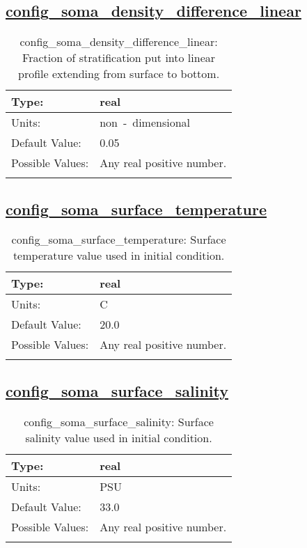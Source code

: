 \subsection[config\_soma\_density\_difference\_linear]{\hyperref[sec:nm_tab_soma]{config\_soma\_density\_difference\_linear}}
\label{subsec:nm_sec_config_soma_density_difference_linear}
\begin{center}
\begin{longtable}{| p{2.0in} || p{4.0in} |}
    \hline
    Type: & real \\
    \hline
    Units: & \si{non-dimensional} \\
    \hline
    Default Value: & 0.05 \\
    \hline
    Possible Values: & Any real positive number. \\
    \hline
    \caption{config\_soma\_density\_difference\_linear: Fraction of stratification put into linear profile extending from surface to bottom.}
\end{longtable}
\end{center}
\subsection[config\_soma\_surface\_temperature]{\hyperref[sec:nm_tab_soma]{config\_soma\_surface\_temperature}}
\label{subsec:nm_sec_config_soma_surface_temperature}
\begin{center}
\begin{longtable}{| p{2.0in} || p{4.0in} |}
    \hline
    Type: & real \\
    \hline
    Units: & \si{C} \\
    \hline
    Default Value: & 20.0 \\
    \hline
    Possible Values: & Any real positive number. \\
    \hline
    \caption{config\_soma\_surface\_temperature: Surface temperature value used in initial condition.}
\end{longtable}
\end{center}
\subsection[config\_soma\_surface\_salinity]{\hyperref[sec:nm_tab_soma]{config\_soma\_surface\_salinity}}
\label{subsec:nm_sec_config_soma_surface_salinity}
\begin{center}
\begin{longtable}{| p{2.0in} || p{4.0in} |}
    \hline
    Type: & real \\
    \hline
    Units: & \si{PSU} \\
    \hline
    Default Value: & 33.0 \\
    \hline
    Possible Values: & Any real positive number. \\
    \hline
    \caption{config\_soma\_surface\_salinity: Surface salinity value used in initial condition.}
\end{longtable}
\end{center}
